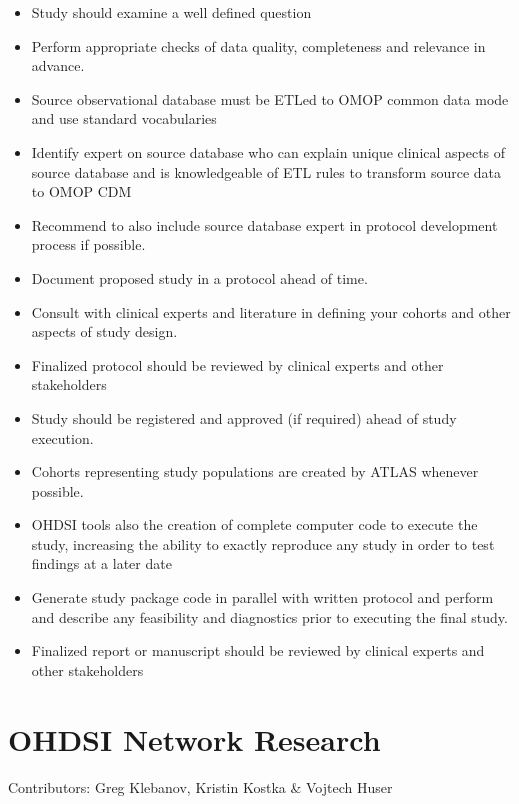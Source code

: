 \documentclass[11pt]{book}
\providecommand{\tightlist}{%
  \setlength{\itemsep}{0pt}\setlength{\parskip}{0pt}}
\theoremstyle{definition}
\theoremstyle{definition}
\theoremstyle{definition}
\theoremstyle{remark}
\let\BeginKnitrBlock\begin \let\EndKnitrBlock\end
\begin{document}
\BeginKnitrBlock{rmdsummary}
\begin{itemize}
\tightlist
\item
  Study should examine a well defined question
\item
  Perform appropriate checks of data quality, completeness and relevance in advance.
\item
  Source observational database must be ETLed to OMOP common data mode and use standard vocabularies
\item
  Identify expert on source database who can explain unique clinical aspects of source database and is knowledgeable of ETL rules to transform source data to OMOP CDM
\item
  Recommend to also include source database expert in protocol development process if possible.
\item
  Document proposed study in a protocol ahead of time.
\item
  Consult with clinical experts and literature in defining your cohorts and other aspects of study design.
\item
  Finalized protocol should be reviewed by clinical experts and other stakeholders
\item
  Study should be registered and approved (if required) ahead of study execution.
\item
  Cohorts representing study populations are created by ATLAS whenever possible.
\item
  OHDSI tools also the creation of complete computer code to execute the study, increasing the ability to exactly reproduce any study in order to test findings at a later date
\item
  Generate study package code in parallel with written protocol and perform and describe any feasibility and diagnostics prior to executing the final study.
\item
  Finalized report or manuscript should be reviewed by clinical experts and other stakeholders
\end{itemize}
\EndKnitrBlock{rmdsummary}

\hypertarget{NetworkResearch}{%
\chapter{OHDSI Network Research}\label{NetworkResearch}}

Contributors: Greg Klebanov, Kristin Kostka \& Vojtech Huser
\end{document}
